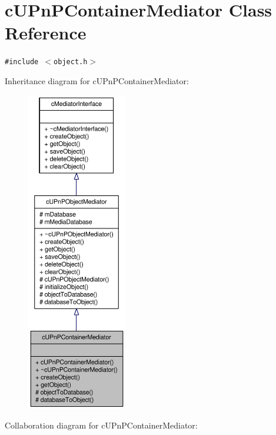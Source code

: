 \hypertarget{classcUPnPContainerMediator}{
\section{cUPnPContainerMediator Class Reference}
\label{classcUPnPContainerMediator}
}
{\tt \#include $<$object.h$>$}

Inheritance diagram for cUPnPContainerMediator:\nopagebreak
\begin{figure}[H]
\begin{center}
\leavevmode
\includegraphics[height=400pt]{classcUPnPContainerMediator__inherit__graph}
\end{center}
\end{figure}
Collaboration diagram for cUPnPContainerMediator:\nopagebreak
